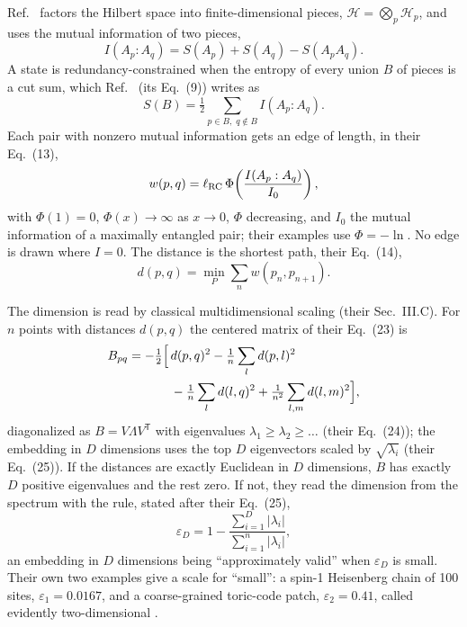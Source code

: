 \documentclass[aps,pre,10pt,twocolumn,superscriptaddress,nofootinbib]{revtex4-2}
\begin{document}
Ref.~\cite{CCM16} factors the Hilbert space into finite-dimensional pieces, $\mathcal H=\bigotimes_p\mathcal H_p$,
and uses the mutual information of two pieces,
\[
I(A_p:A_q)=S(A_p)+S(A_q)-S(A_pA_q).
\]
A state is redundancy-constrained when the entropy of every union $B$ of pieces is a cut sum, which
Ref.~\cite{CCM16} (its Eq.~(9)) writes as
\[
S(B)=\tfrac12\sum_{p\in B,\;q\notin B}I(A_p:A_q).
\]
Each pair with nonzero mutual information gets an edge of length, in their Eq.~(13),
\begin{equation*}
w(p,q)=\ell_{\rm RC}\,\Phi\!\left(\frac{I(A_p:A_q)}{I_0}\right),
\end{equation*}
with $\Phi(1)=0$, $\Phi(x)\to\infty$ as $x\to0$, $\Phi$ decreasing, and $I_0$ the mutual information of a maximally
entangled pair; their examples use $\Phi=-\ln$. No edge is drawn where $I=0$. The distance is the shortest path,
their Eq.~(14),
\begin{equation*}
d(p,q)=\min_{P}\sum_{n}w(p_n,p_{n+1}).
\end{equation*}

The dimension is read by classical multidimensional scaling (their Sec.~III.C). For $n$ points with distances
$d(p,q)$ the centered matrix of their Eq.~(23) is
\begin{equation*}
\begin{aligned}
B_{pq}=-\tfrac12\Bigl[\,&d(p,q)^2-\tfrac1n\sum_l d(p,l)^2\\
&-\tfrac1n\sum_l d(l,q)^2+\tfrac1{n^2}\sum_{l,m}d(l,m)^2\Bigr],
\end{aligned}
\end{equation*}
diagonalized as $B=V\Lambda V^{\mathsf T}$ with eigenvalues $\lambda_1\ge\lambda_2\ge\dots$ (their Eq.~(24)); the
embedding in $D$ dimensions uses the top $D$ eigenvectors scaled by $\sqrt{\lambda_i}$ (their Eq.~(25)). If the
distances are exactly Euclidean in $D$ dimensions, $B$ has exactly $D$ positive eigenvalues and the rest zero. If not,
they read the dimension from the spectrum with the rule, stated after their Eq.~(25),
\begin{equation*}
\varepsilon_D=1-\frac{\sum_{i=1}^{D}|\lambda_i|}{\sum_{i=1}^{n}|\lambda_i|},
\end{equation*}
an embedding in $D$ dimensions being ``approximately valid'' when $\varepsilon_D$ is small. Their own two examples
give a scale for ``small'': a spin-1 Heisenberg chain of 100 sites, $\varepsilon_1=0.0167$, and a coarse-grained
toric-code patch, $\varepsilon_2=0.41$, called evidently two-dimensional \cite{CCM16}.
\end{document}
